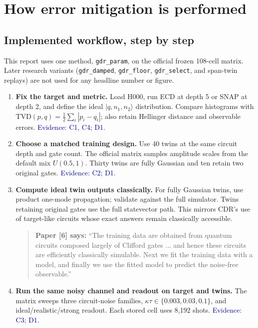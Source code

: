 \documentclass[10pt]{article}
\newcommand{\code}[1]{\texttt{#1}}
\newcommand{\evidence}[1]{\textcolor{navy}{\footnotesize\textsf{Evidence: #1}}}
\newcommand{\paperquote}[2]{%
  \begin{quote}\small\textbf{Paper [#1] says:} ``#2''\end{quote}}
\newcommand{\tvd}{\mathrm{TVD}}
\begin{document}
\section{How error mitigation is performed}

\subsection{Implemented workflow, step by step}

This report uses one method, \code{gdr\_param}, on the official frozen 108-cell matrix.
Later research variants (\code{gdr\_damped}, \code{gdr\_floor}, \code{gdr\_select}, and
span-twin replays) are not used for any headline number or figure.

\begin{enumerate}[label=\textbf{Step \arabic*.},leftmargin=3.6em,itemsep=5pt]
\item \textbf{Fix the target and metric.} Load H000, run ECD at depth 5 or SNAP at depth 2, and define
the ideal $|q,n_1,n_2\rangle$ distribution. Compare histograms with
\(\tvd(p,q)=\frac12\sum_i|p_i-q_i|\); also retain Hellinger distance and observable errors.
\evidence{C1, C4; D1.}

\item \textbf{Choose a matched training design.} Use 40 twins at the same circuit depth and gate
count. The official matrix samples amplitude scales from the default mix $U(0.5,1)$.
Thirty twins are fully Gaussian and ten retain two original gates.
\evidence{C2; D1.}

\item \textbf{Compute ideal twin outputs classically.} For fully Gaussian twins, use product
one-mode propagation; validate against the full simulator. Twins retaining original gates use the
full statevector path. This mirrors CDR's use of target-like circuits whose exact answers remain
classically accessible.
\paperquote{6}{The training data are obtained from quantum circuits composed largely of Clifford
gates ... and hence these circuits are efficiently classically simulable. Next we fit the training
data with a model, and finally we use the fitted model to predict the noise-free observable.}

\item \textbf{Run the same noisy channel and readout on target and twins.} The matrix sweeps three
circuit-noise families, $\kappa\tau\in\{0.003,0.03,0.1\}$, and ideal/realistic/strong readout.
Each stored cell uses 8,192 shots. \evidence{C3; D1.}


\end{enumerate}
\end{document}
